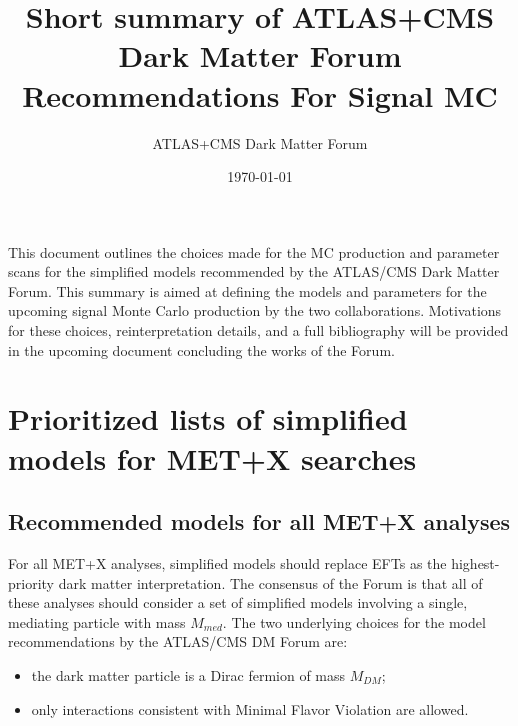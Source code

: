 \documentclass[a4,debug,notitlepage,nobib]{tufte-handout}
\title{Short summary of ATLAS+CMS Dark Matter Forum Recommendations For Signal MC}
\author{ATLAS+CMS Dark Matter Forum}
\date{\today}
\newcommand{\blankpage}{\newpage\hbox{}\thispagestyle{empty}\newpage}
\begin{document}
\morefloats
\setcounter{secnumdepth}{3} %

% 

\maketitle


This document outlines the choices made for the MC production and parameter scans
for the simplified models recommended by the ATLAS/CMS Dark Matter Forum. 
This summary is aimed at defining the models and parameters
for the upcoming signal Monte Carlo production by the two collaborations. 
Motivations for these choices, reinterpretation details, and a full bibliography 
will be provided in the upcoming document concluding the works of the Forum. 

\section{Prioritized lists of simplified models for MET+X searches}

\subsection{Recommended models for all MET+X analyses}
\label{sec:RecommendedModelsAllAnalyses}

For all MET+X analyses, simplified models should replace EFTs as the
highest-priority dark matter interpretation. The consensus of the
Forum is that all of these analyses should consider a set of simplified models involving 
a single, mediating particle with mass $M_{med}$. 
The two underlying choices for the model recommendations by the ATLAS/CMS DM Forum are:
\begin{itemize}
 \item the dark matter particle is a Dirac fermion of mass $M_{DM}$;
 \item only interactions consistent with Minimal Flavor Violation are allowed.
\end{itemize}
\end{document}
